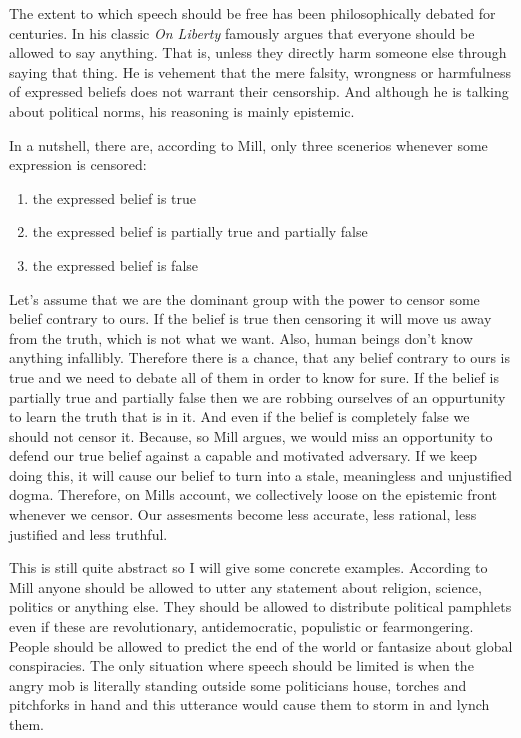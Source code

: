 \documentclass{essay-formal}
\begin{document}
The extent to which speech should be free has been philosophically debated for centuries. In his classic \emph{On Liberty} \textcite{mill2011} famously argues that everyone should be allowed to say anything. That is, unless they directly harm someone else through saying that thing. He is vehement that the mere falsity, wrongness or harmfulness of expressed beliefs does not warrant their censorship. And although he is talking about political norms, his reasoning is mainly epistemic.

In a nutshell, there are, according to Mill, only three scenerios whenever some expression is censored:

\begin{enumerate}
	\item the expressed belief is true
	\item the expressed belief is partially true and partially false
	\item the expressed belief is false
\end{enumerate}

Let's assume that we are the dominant group with the power to censor some belief contrary to ours. If the belief is true then censoring it will move us away from the truth, which is not what we want. Also, human beings don't know anything infallibly. Therefore there is a chance, that any belief contrary to ours is true and we need to debate all of them in order to know for sure. If the belief is partially true and partially false then we are robbing ourselves of an oppurtunity to learn the truth that is in it. And even if the belief is completely false we should not censor it. Because, so Mill argues, we would miss an opportunity to defend our true belief against a capable and motivated adversary. If we keep doing this, it will cause our belief to turn into a stale, meaningless and unjustified dogma. Therefore, on Mills account, we collectively loose on the epistemic front whenever we censor. Our assesments become less accurate, less rational, less justified and less truthful.

This is still quite abstract so I will give some concrete examples. According to Mill anyone should be allowed to utter any statement about religion, science, politics or anything else. They should be allowed to distribute political pamphlets even if these are revolutionary, antidemocratic, populistic or fearmongering. People should be allowed to predict the end of the world or fantasize about global conspiracies. The only situation where speech should be limited is when the angry mob is literally standing outside some politicians house, torches and pitchforks in hand and this utterance would cause them to storm in and lynch them.%
\end{document}
